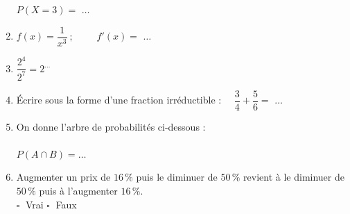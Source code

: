 \documentclass[a4paper,11pt,landscape,exos]{nsi} %
\begin{document}
\begin{multicols}{2}
\begin{enumerate}[]
\medskip
 $P(X=3)=$ $\ldots$
	\item $f(x)=\dfrac{1}{x^3}\ ;\qquad$
    $f'(x)=$ $\ldots$
	\item $\dfrac{2^4}{2^7}=2^{\ldots}$
	\item Écrire sous la forme d'une fraction irréductible :
          $\quad \dfrac{3}{4} + \dfrac{5}{6}=$
              $\ldots$
	\item On donne l'arbre de probabilités ci-dessous :\\
    \def\abun{A}
 \def\alun{0,7}
 \def\abdeux{$\barmaj{A}$}
 \def\aldeux{}
 \def\abtrois{$B$}
 \def\altrois{0,2}
 \def\abquatre{$\barmaj{B}$}
 \def\alquatre{}
\def\abcinq{$B$}
 \def\alcinq{0,2}
 \def\absix{$\barmaj{B}$}
 \def\alsix{}
 \arbreproba\\
    $P(A\cap B)=\ldots$ 

	\item Augmenter un prix de $16\,\%$ puis le  diminuer de $50\,\%$ revient à le
    diminuer de $50\,\%$  puis à l’augmenter $16\,\%$.\\	$\square\;$ Vrai \qquad $\square\;$ Faux\qquad 
   


\end{enumerate}
\end{multicols}
\end{document}
